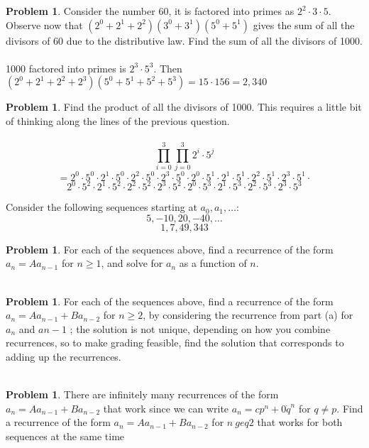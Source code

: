 \documentclass[10pt,leqno ]{article}
\theoremstyle{definition}
\newtheorem{problem}[theorem]{Problem}
\begin{document}
\begin{problem} Consider the number 60, it is factored into primes as $2^2 \cdot 3 \cdot 5$.  Observe now that $(2^0+ 2^1+ 2^2)(3^0+ 3^1)(5^0+ 5^1)$ gives the sum of all the divisors of 60 due to the distributive law.  Find the sum of all the divisors of 1000.
\\\\
\Large
1000 factored into primes is $2^3 \cdot 5^3$.  Then $(2^0 + 2^1 + 2^2 + 2^3)( 5^0 + 5^1 + 5^2 + 5^3) = 15 \cdot 156 = 2,340$
\end{problem}
\newpage

\begin{problem} Find the product of all the divisors of 1000.  This requires a little bit of thinking along the lines of the previous question.
\\\\
\Large
$$\prod_{i=0}^{3} \prod_{j=0}^{3}2^i \cdot 5^j$$
$$= 2^0 \cdot 5^0 \cdot 2^1 \cdot 5^0 \cdot 2^2 \cdot 5^0 \cdot 2^3 \cdot 5^0 \cdot 2^0 \cdot 5^1 \cdot 2^1 \cdot 5^1 \cdot 2^2 \cdot 5^1 \cdot 2^3 \cdot 5^1 \cdot$$
$$2^0 \cdot 5^2 \cdot 2^1 \cdot 5^2 \cdot 2^2 \cdot 5^2 \cdot 2^3 \cdot 5^2 \cdot 2^0 \cdot 5^3 \cdot 2^1 \cdot 5^3 \cdot 2^2 \cdot 5^3 \cdot 2^3 \cdot 5^3$$
\end{problem}
\newpage

Consider the following sequences starting at $a_0, a_1, \dots$:
$$5, -10, 20, -40, \dots$$
$$ 1, 7, 49, 343$$
\begin{problem} For each of the sequences above, find a recurrence of the form $a_n = Aa_{n-1}$ for $n \geq 1$, and solve for $a_n$ as a function of $n$.
\\\\
\Large
\end{problem}
\newpage

\begin{problem} For each of the sequences above, find a recurrence of the form $a_n=Aa_{n-1} + Ba_{n-2}$ for $n \geq 2$, by considering the recurrence from part (a) for $a_n$ and $a{n-1}$ ; the solution is not unique,  depending on how you combine recurrences,  so to make grading feasible, find the solution that corresponds to adding up the recurrences.
\\\\
\Large
\end{problem}
\newpage

\begin{problem} There are infinitely many recurrences of the form $a_n=Aa_{n-1}+Ba_{n-2}$ that work since we can write $a_n=cp^n+ 0 \dot q^n$ for $q \neq p$.  Find a recurrence of the form $a_n=Aa_{n-1}+Ba_{n-2}$ for $n\ geq 2$ that works for both sequences at the same time
\\\\
\Large
\end{problem}
\newpage
\end{document}
